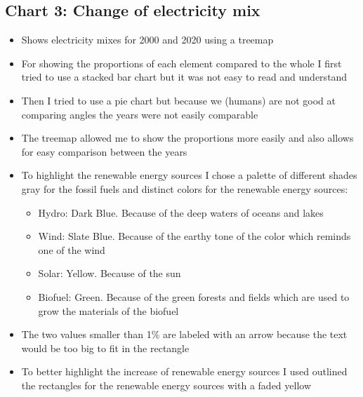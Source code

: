 \documentclass{article}
\begin{document}
\subsection{Chart 3: Change of electricity mix}
\begin{itemize}
    \item Shows electricity mixes for 2000 and 2020 using a treemap
    \item For showing the proportions of each element compared to the whole I first tried to use a stacked bar chart but it was not easy to read and understand
    \item Then I tried to use a pie chart but because we (humans) are not good at comparing angles the years were not easily comparable
    \item The treemap allowed me to show the proportions more easily and also allows for easy comparison between the years
    \item To highlight the renewable energy sources I chose a palette of different shades gray for the fossil fuels and distinct colors for the renewable energy sources:
    \begin{itemize}
        \item Hydro: Dark Blue. Because of the deep waters of oceans and lakes
        \item Wind: Slate Blue. Because of the earthy tone of the color which reminds one of the wind
        \item Solar: Yellow. Because of the sun
        \item Biofuel: Green. Because of the green forests and fields which are used to grow the materials of the biofuel
    \end{itemize}
    \item The two values smaller than 1\% are labeled with an arrow because the text would be too big to fit in the rectangle
    \item To better highlight the increase of renewable energy sources I used outlined the rectangles for the renewable energy sources with a faded yellow
\end{itemize}
\end{document}
